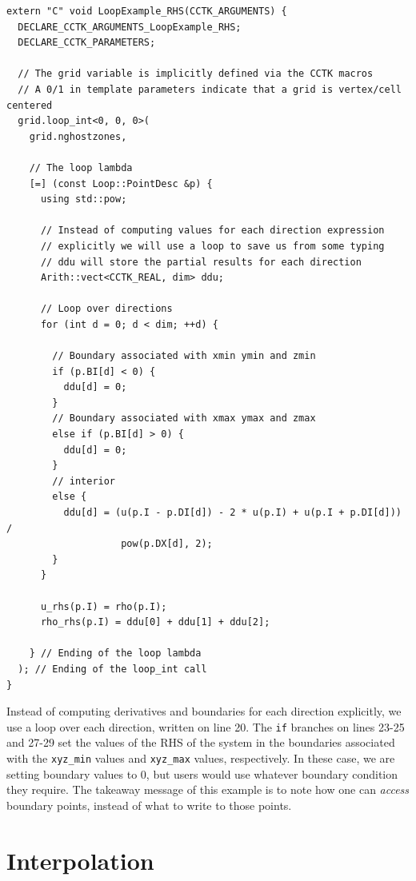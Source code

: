 \begin{lstlisting}
extern "C" void LoopExample_RHS(CCTK_ARGUMENTS) {
  DECLARE_CCTK_ARGUMENTS_LoopExample_RHS;
  DECLARE_CCTK_PARAMETERS;

  // The grid variable is implicitly defined via the CCTK macros
  // A 0/1 in template parameters indicate that a grid is vertex/cell centered
  grid.loop_int<0, 0, 0>(
    grid.nghostzones,

    // The loop lambda
    [=] (const Loop::PointDesc &p) {
      using std::pow;

      // Instead of computing values for each direction expression
      // explicitly we will use a loop to save us from some typing
      // ddu will store the partial results for each direction
      Arith::vect<CCTK_REAL, dim> ddu;
      
      // Loop over directions
      for (int d = 0; d < dim; ++d) {
        
        // Boundary associated with xmin ymin and zmin
        if (p.BI[d] < 0) {
          ddu[d] = 0;
        }
        // Boundary associated with xmax ymax and zmax
        else if (p.BI[d] > 0) {
          ddu[d] = 0;
        }
        // interior
        else {
          ddu[d] = (u(p.I - p.DI[d]) - 2 * u(p.I) + u(p.I + p.DI[d])) /
                    pow(p.DX[d], 2);
        }
      }

      u_rhs(p.I) = rho(p.I);
      rho_rhs(p.I) = ddu[0] + ddu[1] + ddu[2];

    } // Ending of the loop lambda
  ); // Ending of the loop_int call
}
\end{lstlisting}

Instead of computing derivatives and boundaries for each direction explicitly, we use a loop over each direction, written on line 20. The \texttt{if} branches on lines 23-25 and 27-29 set the values of the RHS of the system in the boundaries associated with the \texttt{xyz\_min} values and \texttt{xyz\_max} values, respectively. In these case, we are setting boundary values to $0$, but users would use whatever boundary condition they require. The takeaway message of this example is to note how one can \textit{access} boundary points, instead of what to write to those points.

\section{Interpolation}
\label{sec:interpolation}

